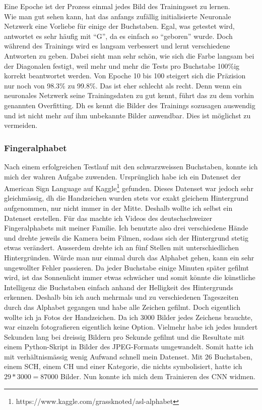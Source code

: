 \documentclass[10pt,a4paper,ngerman,english]{article}
\begin{document}
Eine Epoche ist der Prozess einmal jedes Bild des Trainingsset zu lernen.\\

Wie man gut sehen kann, hat das anfangs zufällig initialisierte Neuronale Netzwerk eine Vorliebe für einige der Buchstaben. Egal, was getestet wird, antwortet es sehr häufig mit \enquote{G}, da es einfach so \enquote{geboren} wurde. Doch während des Trainings wird es langsam verbessert und lernt verschiedene Antworten zu geben. Dabei sieht man sehr schön, wie sich die Farbe langsam bei der Diagonalen festigt, weil mehr und mehr die Tests pro Buchstabe 100\%ig korrekt beantwortet werden. Von Epoche 10 bis 100 steigert sich die Präzision nur noch von 98.3\% zu 99.8\%. Das ist eher schlecht als recht. Denn wenn ein neuronales Netzwerk seine Trainingsdaten zu gut kennt, führt das zu dem vorhin genannten Overfitting. Dh es kennt die Bilder des Trainings sozusagen auswendig und ist nicht mehr auf ihm unbekannte Bilder anwendbar. Dies ist möglichst zu vermeiden.

\subsubsection{Fingeralphabet}

Nach einem erfolgreichen Testlauf mit den schwarzweissen Buchstaben, konnte ich mich der wahren Aufgabe zuwenden. Ursprünglich habe ich ein Datenset der American Sign Language auf Kaggle\footnote{https://www.kaggle.com/grassknoted/asl-alphabet} gefunden. Dieses Datenset war jedoch sehr gleichmässig, dh die Handzeichen wurden stets vor exakt gleichem Hintergrund aufgenommen, nur nicht immer in der Mitte. Deshalb wollte ich selbst ein Datenset erstellen. Für das machte ich Videos des deutschschweizer Fingeralphabets mit meiner Familie. Ich benutzte also drei verschiedene Hände und drehte jeweils die Kamera beim Filmen, sodass sich der Hintergrund stetig etwas verändert. Ausserdem drehte ich an fünf Stellen mit unterschiedlichen Hintergründen. Würde man nur einmal durch das Alphabet gehen, kann ein sehr ungewollter Fehler passieren. Da jeder Buchstabe einige Minuten später gefilmt wird, ist das Sonnenlicht immer etwas schwächer und somit könnte die künstliche Intelligenz die Buchstaben einfach anhand der Helligkeit des Hintergrunds erkennen. Deshalb bin ich auch mehrmals und zu verschiedenen Tageszeiten durch das Alphabet gegangen und habe alle Zeichen gefilmt. Doch eigentlich wollte ich ja Fotos der Handzeichen. Da ich 3000 Bilder jedes Zeichens brauchte, war einzeln fotografieren eigentlich keine Option. Vielmehr habe ich jedes hundert Sekunden lang bei dreissig Bildern pro Sekunde gefilmt und die Resultate mit einem Python-Skript in Bilder des JPEG-Formats umgewandelt. Somit hatte ich mit verhältnismässig wenig Aufwand schnell mein Datenset. Mit 26 Buchstaben, einem SCH, einem CH und einer Kategorie, die nichts symbolisiert, hatte ich $ 29*3000 = 87000 $ Bilder. Nun konnte ich mich dem Trainieren des CNN widmen.\\
\end{document}

